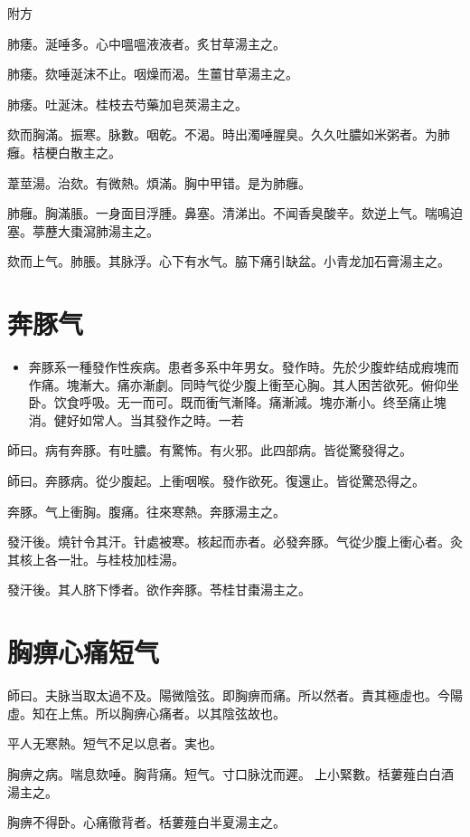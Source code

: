 \documentclass[11pt,oneside,b5paper]{ctexbook}
\begin{document}
\begin{flushleft}
附方

肺痿。涎唾多。心中嗢嗢液液者。炙甘草湯主之。

肺痿。欬唾涎沫不止。咽燥而渴。生薑甘草湯主之。

肺痿。吐涎沫。桂枝去芍藥加皂莢湯主之。

欬而胸滿。振寒。脉數。咽乾。不渴。時出濁唾腥臭。久久吐膿如米粥者。为肺癰。桔梗白散主之。

葦莖湯。治欬。有微熱。煩滿。胸中甲错。是为肺癰。

肺癰。胸滿脹。一身面目浮腫。鼻塞。清涕出。不闻香臭酸辛。欬逆上气。喘鳴迫塞。葶藶大棗瀉肺湯主之。

欬而上气。肺脹。其脉浮。心下有水气。脇下痛引缺盆。小青龙加石膏湯主之。

\chapter{奔豚气}

\begin{itemize}
\item 奔豚系一種發作性疾病。患者多系中年男女。發作時。先於少腹蚱结成瘕塊而作痛。塊漸大。痛亦漸劇。同時气從少腹上衝至心胸。其人困苦欲死。俯仰坐卧。饮食呼吸。无一而可。既而衝气漸降。痛漸減。塊亦漸小。终至痛止塊消。健好如常人。当其發作之時。一若
\end{itemize}

師曰。病有奔豚。有吐膿。有驚怖。有火邪。此四部病。皆從驚發得之。

師曰。奔豚病。從少腹起。上衝咽喉。發作欲死。復還止。皆從驚恐得之。

奔豚。气上衝胸。腹痛。往來寒熱。奔豚湯主之。

發汗後。燒针令其汗。针處被寒。核起而赤者。必發奔豚。气從少腹上衝心者。灸其核上各一壯。与桂枝加桂湯。

發汗後。其人脐下悸者。欲作奔豚。苓桂甘棗湯主之。

\chapter{胸痹心痛短气}

師曰。夫脉当取太過不及。陽微陰弦。即胸痹而痛。所以然者。責其極虛也。今陽虛。知在上焦。所以胸痹心痛者。以其陰弦故也。

平人无寒熱。短气不足以息者。実也。

胸痹之病。喘息欬唾。胸背痛。短气。寸口脉沈而遲。{𬮦}上小緊數。栝蔞薤白白酒湯主之。

胸痹不得卧。心痛徹背者。栝蔞薤白半夏湯主之。


\end{flushleft}
\end{document}
